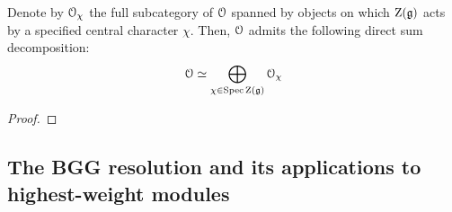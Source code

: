         \begin{theorem} \label{theorem: block_decomposition_of_category_O}
            Denote by $\mathcal{O}_{\chi}$ the full subcategory of $\mathcal{O}$ spanned by objects on which $\mathrm{Z}(\mathfrak{g})$ acts by a specified central character $\chi$. Then, $\mathcal{O}$ admits the following direct sum decomposition:
                $$\mathcal{O} \simeq \bigoplus_{\chi \in \operatorname{Spec} \mathrm{Z}(\mathfrak{g})} \mathcal{O}_{\chi}$$
        \end{theorem}
            \begin{proof}
                
            \end{proof}

    \subsection{The BGG resolution and its applications to highest-weight modules}